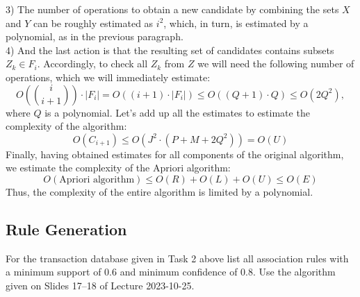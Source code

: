\documentclass{article}
\begin{document}
  3) The number of operations to obtain a new candidate by combining the sets $X$ and $Y$ can be roughly estimated as $i^2$, which, in turn, is estimated by a polynomial, as in the previous paragraph.\\

  4) And the last action is that the resulting set of candidates contains subsets $Z_{k} \in F_{i}$. Accordingly, to check all $Z_{k}$ from $Z$ we will need the following number of operations, which we will immediately estimate:
  $$O\left(\binom {i} {i + 1}\right) \cdot |F_{i}| = O((i + 1) \cdot |F_{i}|) \leq O((Q + 1) \cdot Q) \leq O(2Q^2),$$ where $Q$ is a polynomial.
  Let's add up all the estimates to estimate the complexity of the algorithm:
  $$O(C_{i+1}) \leq O(J^2 \cdot (P + M + 2Q^2)) = O(U)$$
  Finally, having obtained estimates for all components of the original algorithm, we estimate the complexity of the Apriori algorithm:
  $$O(\text{Apriori algorithm}) \leq O(R) + O(L) + O(U) \leq O(E)$$
  Thus, the complexity of the entire algorithm is limited by a polynomial.

  \subsection{Rule Generation}
  \begin{centerframebox}
    For the transaction database given in Task 2 above list all association rules with
    a minimum support of $0.6$ and minimum confidence of $0.8$. Use the algorithm
    given on Slides 17--18 of Lecture 2023-10-25.
  \end{centerframebox}
\end{document}
